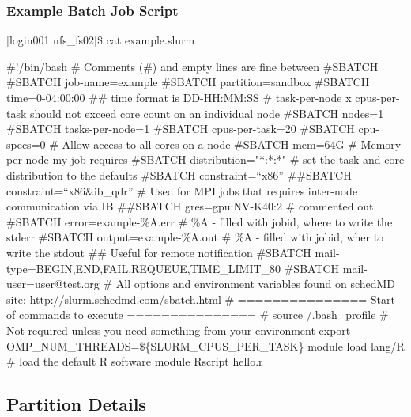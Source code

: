 \begin{frame}[fragile]
\frametitle{Example Batch Job Script}
\begin{semiverbatim}\tiny
[login001 nfs_fs02]\$ cat example.slurm

\#!/bin/bash
\# Comments (\#) and empty lines are fine between \#SBATCH
\#SBATCH \ddash{}job-name=example
\#SBATCH \ddash{}partition=sandbox
\#SBATCH \ddash{}time=0-04:00:00 ## time format is DD-HH:MM:SS
\# task-per-node x cpus-per-task should not exceed core count on an individual node 
\#SBATCH \ddash{}nodes=1
\#SBATCH \ddash{}tasks-per-node=1
\#SBATCH \ddash{}cpus-per-task=20
\#SBATCH \ddash{}cpu-specs=0 # Allow access to all cores on a node
\#SBATCH \ddash{}mem=64G \# Memory per node my job requires
\#SBATCH \ddash{}distribution="*:*:*" \# set the task and core distribution to the defaults
\#SBATCH \ddash{}constraint=``x86''
\#\#SBATCH \ddash{}constraint=``x86\&ib_qdr'' \# Used for MPI jobs that requires inter-node communication via IB
\#\#SBATCH \ddash{}gres=gpu:NV-K40:2 \# commented out
\#SBATCH \ddash{}error=example-\%A.err \# \%A - filled with jobid, where to write the stderr
\#SBATCH \ddash{}output=example-\%A.out \# \%A - filled with jobid, wher to write the stdout
\#\# Useful for remote notification
\#SBATCH \ddash{}mail-type=BEGIN,END,FAIL,REQUEUE,TIME\_LIMIT\_80
\#SBATCH \ddash{}mail-user=user@test.org
\# All options and environment variables found on schedMD site: \href{http://slurm.schedmd.com/sbatch.html}{http://slurm.schedmd.com/sbatch.html}
\# =============== Start of commands to execute ===============
\# source \ctilde/.bash_profile \# Not required unless you need something from your environment
export OMP\_NUM\_THREADS=\$\{SLURM\_CPUS\_PER\_TASK\}
module load lang/R  \# load the default R software module
Rscript hello.r
\end{semiverbatim}
\end{frame}




\subsection{Partition Details}

